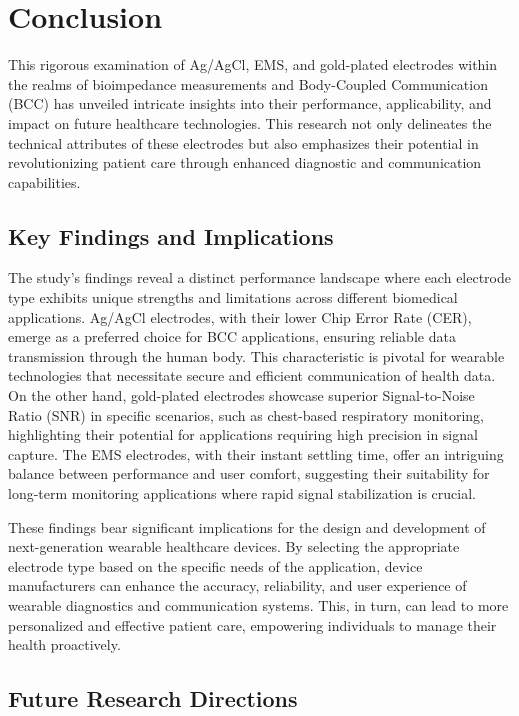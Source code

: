 \documentclass[conference]{IEEEtran}
\begin{document}
\section{Conclusion}

This rigorous examination of Ag/AgCl, EMS, and gold-plated electrodes within the realms of bioimpedance measurements and Body-Coupled Communication (BCC) has unveiled intricate insights into their performance, applicability, and impact on future healthcare technologies. This research not only delineates the technical attributes of these electrodes but also emphasizes their potential in revolutionizing patient care through enhanced diagnostic and communication capabilities.

\subsection{Key Findings and Implications}

The study's findings reveal a distinct performance landscape where each electrode type exhibits unique strengths and limitations across different biomedical applications. Ag/AgCl electrodes, with their lower Chip Error Rate (CER), emerge as a preferred choice for BCC applications, ensuring reliable data transmission through the human body. This characteristic is pivotal for wearable technologies that necessitate secure and efficient communication of health data. On the other hand, gold-plated electrodes showcase superior Signal-to-Noise Ratio (SNR) in specific scenarios, such as chest-based respiratory monitoring, highlighting their potential for applications requiring high precision in signal capture. The EMS electrodes, with their instant settling time, offer an intriguing balance between performance and user comfort, suggesting their suitability for long-term monitoring applications where rapid signal stabilization is crucial.

These findings bear significant implications for the design and development of next-generation wearable healthcare devices. By selecting the appropriate electrode type based on the specific needs of the application, device manufacturers can enhance the accuracy, reliability, and user experience of wearable diagnostics and communication systems. This, in turn, can lead to more personalized and effective patient care, empowering individuals to manage their health proactively.

\subsection{Future Research Directions}
\end{document}

